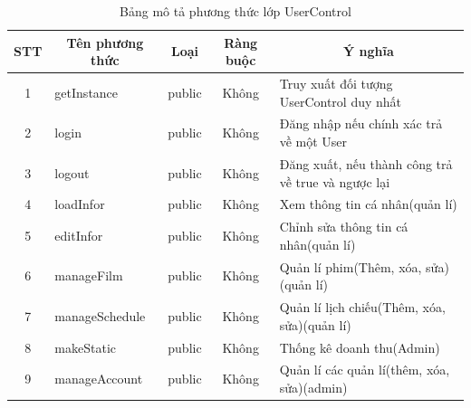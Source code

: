 \documentclass[a4paper, 12pt]{article}
\begin{document}
\begin{table}[H]
	\begin{center}
		\begin{tabular}{|c|l|c|c|l|}
			\hline
			STT & \multicolumn{1}{c|}{Tên phương thức} & \multicolumn{1}{c|}{Loại}   & \multicolumn{1}{c|}{Ràng buộc} & \multicolumn{1}{c|}{Ý nghĩa}                       \\ \hline
			1   & getInstance                          & \multicolumn{1}{c|}{public} &       Không                         & Truy xuất đối tượng UserControl duy nhất           \\ \hline
			2   & login                                & public                      &       Không                         & Đăng nhập nếu chính xác trả về một User            \\ \hline
			3   & logout                               & public                      &       Không                         & Đăng xuất, nếu thành công trả về true và ngược lại \\ \hline
			4   & loadInfor                            & public                      &       Không                         & Xem thông tin cá nhân(quản lí)                     \\ \hline
			5   & editInfor                            & public                      &       Không                         & Chỉnh sửa thông tin cá nhân(quản lí)               \\ \hline
			6   & manageFilm                           & public                      &       Không                         & Quản lí phim(Thêm, xóa, sửa)(quản lí)              \\ \hline
			7   & manageSchedule                       & public                      &       Không                         & Quản lí lịch chiếu(Thêm, xóa, sửa)(quản lí)        \\ \hline
			8   & makeStatic                           & public                      &       Không                         & Thống kê doanh thu(Admin)                          \\ \hline
			9   & manageAccount                        & public                      &       Không                         & Quản lí các quản lí(thêm, xóa, sửa)(admin)         \\ \hline
		\end{tabular}
		\caption{Bảng mô tả phương thức lớp UserControl}
	\end{center}
\end{table}
\end{document}
